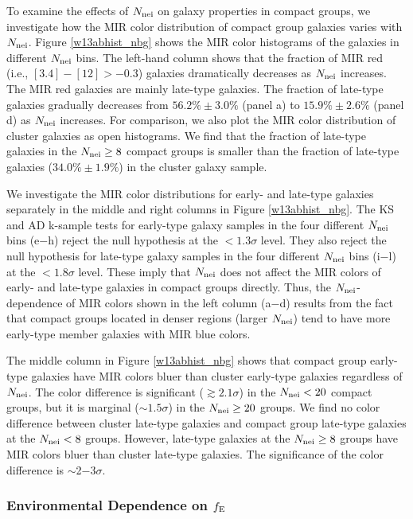\documentclass[12pt,preprint,apj]{emulateapj}
\newcommand{\efrac}{f_{\rm E}}
\newcommand{\nbg}{N_{\rm nei}}
\begin{document}
To examine the effects of $\nbg$ on galaxy properties in compact groups,
we investigate how the MIR color distribution of compact group galaxies 
varies with $\nbg$. 
Figure \ref{w13abhist_nbg} shows the MIR color histograms of the galaxies  
in different $\nbg$ bins. 
The left-hand column shows that 
the fraction of MIR red (i.e., $[3.4]-[12]>-0.3$) 
galaxies dramatically decreases as $\nbg$ increases. 
The MIR red galaxies are mainly late-type galaxies.
The fraction of late-type galaxies gradually decreases from $56.2\%\pm3.0\%$ 
(panel a) to $15.9\%\pm2.6\%$ (panel d) as $\nbg$ increases. 
For comparison, we also plot the MIR color distribution of cluster galaxies 
as open histograms. 
We find that the fraction of late-type galaxies in the $\nbg\geq8$ compact groups 
is smaller than the fraction of late-type galaxies ($34.0\%\pm1.9\%$) in the cluster 
galaxy sample. 

We investigate the MIR color distributions for early- and late-type galaxies
separately in the middle and right columns in Figure \ref{w13abhist_nbg}.
The KS and AD k-sample tests for early-type galaxy samples in the four different
$\nbg$ bins (e$-$h) reject the null hypothesis at the $<1.3\sigma$ level.
They also reject the null hypothesis for late-type galaxy samples in the four different 
$\nbg$ bins (i$-$l) at the $<1.8\sigma$ level. 
These imply that $\nbg$ does not affect the MIR colors of early- and late-type 
galaxies in compact groups directly.
Thus, the $\nbg$-dependence of MIR colors shown in the left column (a$-$d) 
results from the fact that compact groups located in denser regions 
(larger $\nbg$) tend to have more early-type member galaxies with MIR blue colors. 




The middle column in Figure \ref{w13abhist_nbg} shows that  
compact group early-type galaxies have MIR colors bluer than 
cluster early-type galaxies regardless of $\nbg$.
The color difference is significant ($\gtrsim2.1\sigma$) in the $\nbg<20$ compact groups, 
but it is marginal ($\sim1.5\sigma$) in the $\nbg\geq20$ groups. 
We find no color difference between cluster late-type galaxies 
and compact group late-type galaxies at the $\nbg<8$ groups.
However, late-type galaxies at the $\nbg\geq8$ groups have MIR colors bluer 
than cluster late-type galaxies.
The significance of the color difference is $\sim$2$-$3$\sigma$.


\subsubsection{Environmental Dependence on $\efrac$}
\end{document}
